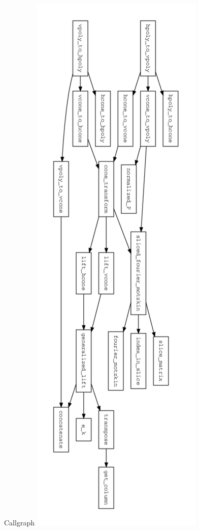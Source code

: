 \documentclass{beamer}
\begin{document}
\begin{frame}{Callgraph}
\includegraphics[angle=90, width=\textwidth]{../img/callgraph.pdf}
\end{frame}
\end{document}
